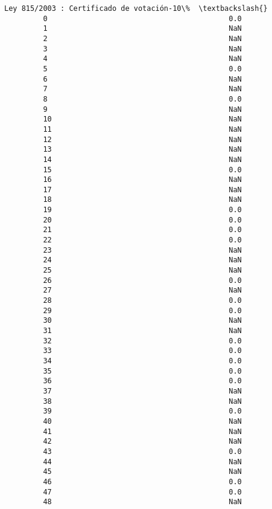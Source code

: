 \documentclass[11pt]{article}
\begin{document}
\begin{Verbatim}[commandchars=\\\{\}]
             Ley 815/2003 : Certificado de votación-10\%  \textbackslash{}
         0                                          0.0   
         1                                          NaN   
         2                                          NaN   
         3                                          NaN   
         4                                          NaN   
         5                                          0.0   
         6                                          NaN   
         7                                          NaN   
         8                                          0.0   
         9                                          NaN   
         10                                         NaN   
         11                                         NaN   
         12                                         NaN   
         13                                         NaN   
         14                                         NaN   
         15                                         0.0   
         16                                         NaN   
         17                                         NaN   
         18                                         NaN   
         19                                         0.0   
         20                                         0.0   
         21                                         0.0   
         22                                         0.0   
         23                                         NaN   
         24                                         NaN   
         25                                         NaN   
         26                                         0.0   
         27                                         NaN   
         28                                         0.0   
         29                                         0.0   
         30                                         NaN   
         31                                         NaN   
         32                                         0.0   
         33                                         0.0   
         34                                         0.0   
         35                                         0.0   
         36                                         0.0   
         37                                         NaN   
         38                                         NaN   
         39                                         0.0   
         40                                         NaN   
         41                                         NaN   
         42                                         NaN   
         43                                         0.0   
         44                                         NaN   
         45                                         NaN   
         46                                         0.0   
         47                                         0.0   
         48                                         NaN   
         

\end{Verbatim}
\end{document}
